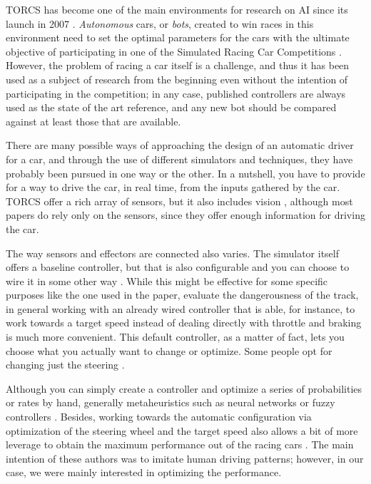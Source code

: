 \documentclass[conference]{IEEEtran}
\begin{document}
TORCS has become one of the
main environments for research on AI since its launch in 2007
\cite{torcs4}. {\em Autonomous} cars, or {\em bots}, created to win
races in this environment need to set the optimal parameters for the
cars \cite{Kole-ParamCarTunning12} with the ultimate objective of
participating in one of the Simulated Racing Car Competitions
\cite{SimulatedCarRacing-2008,SimulatedCarRacing-2010}. However, the
problem of racing a car itself is a challenge, and thus it has been used as a subject
of research from the beginning even without the intention of
participating in the competition; in any case, published controllers
are always used as the state of the art reference, and any new bot
should be compared against at least those that are available.

There are many possible ways of approaching the design of an automatic
driver for a car, and through the use of different simulators and
techniques, they have probably been pursued in one way or the
other. In a nutshell, you have to provide for a way to drive the car,
in real time, from the inputs gathered by the car. TORCS offer a rich
array of sensors, but it also includes vision  \cite{Floreano2004,zhu2018driving}, although most papers do
rely only on the sensors, since they offer enough information for
driving the car.

The way sensors and effectors are connected also varies. The simulator
itself offers a baseline controller, but that is also configurable and
you can choose to wire it in some other way
\cite{cussat2016dangerousness}. While this might be effective for some
specific purposes like the one used in the paper, evaluate the
dangerousness of the track, in general working with an already wired
controller that is able, for instance, to work towards a target speed
instead of dealing directly with throttle and braking is much more
convenient. This default controller, as a matter of fact, lets you
choose what you actually want to change or optimize. Some people opt
for changing just the steering
\cite{CarRacing_Pelta09,Nikulin:2018:EAC:3205455.3205547,LFAG}.

Although you can simply create a controller and optimize a series of
probabilities or rates by hand, generally metaheuristics such as
neural networks \cite{zhu2018driving} or fuzzy controllers
\cite{armagan2017fuzzy}. Besides, working towards the automatic
configuration via optimization of the steering wheel and the target speed also allows a
bit of more leverage to obtain the maximum performance out of the
racing cars
\cite{CarRacing_Pelta09,PerezEvolvingFuzzy09,torcs2012}. The main
intention of these authors was to imitate human driving patterns;
however, in our case, we were mainly interested in optimizing the
performance.
\end{document}
